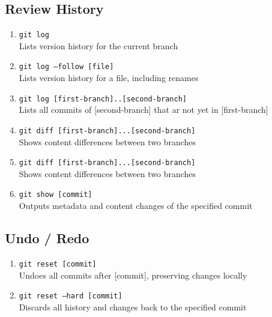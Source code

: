 \documentclass[a4paper, twoside, 8pt]{extarticle}
\newenvironment{enumx} {
	\begin{enumerate}[leftmargin=*]
	\setlength{\topsep}{0pt}
	\setlength{\itemsep}{0pt}
	\setlength{\parskip}{0pt}
	\setlength{\parsep}{0pt}
	}
{\end{enumerate}}
\begin{document}
\begin{multicols}{3}
\subsection{Review History}
\begin{enumx}
    \item \texttt{git log}\\
    Lists version history for the current branch
    \item \texttt{git log --follow [file]}\\
    Lists version history for a file, including renames
    \item \texttt{git log [first-branch]..[second-branch]}\\
    Lists all commits of [second-branch] that ar not yet in [first-branch]
    \item \texttt{git diff [first-branch]...[second-branch]}\\
    Shows content differences between two branches
    \item \texttt{git diff [first-branch]...[second-branch]}\\
    Shows content differences between two branches
    \item \texttt{git show [commit]}\\
    Outputs metadata and content changes of the specified commit
\end{enumx}

\subsection{Undo / Redo}
\begin{enumx}
    \item \texttt{git reset [commit]}\\
    Undoes all commits after [commit], preserving changes locally
    \item \texttt{git reset --hard [commit]}\\
    Discards all history and changes back to the specified commit
\end{enumx}


\end{multicols}
\end{document}
